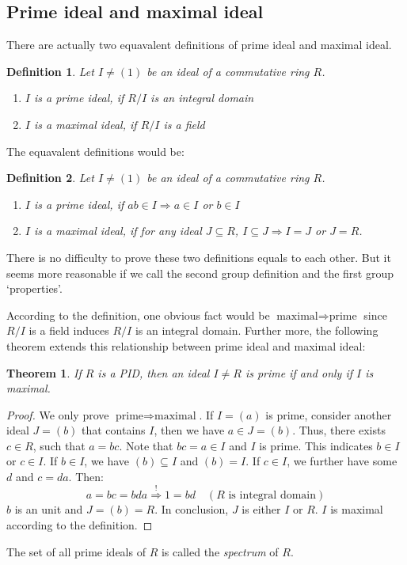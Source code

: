 \documentclass[a4paper, pdf, 11.5pt]{article}
\newtheorem{definition}{Definition}
\newtheorem{theorem}{Theorem}
\begin{document}
\subsection{Prime ideal and maximal ideal}
There are actually two equavalent definitions of prime ideal and maximal ideal. 
\begin{definition}
  Let $I\neq (1)$ be an ideal of a commutative ring $R$.
  \begin{enumerate}
    \item $I$ is a prime ideal, if $R/I$ is an integral domain
    \item $I$ is a maximal ideal, if $R/I$ is a field
  \end{enumerate}
\end{definition}
\noindent
The equavalent definitions would be:
\begin{definition}
  Let $I\neq (1)$ be an ideal of a commutative ring $R$.
  \begin{enumerate}
    \item $I$ is a prime ideal, if $ab\in I\Rightarrow a\in I$ or $b\in I$
    \item $I$ is a maximal ideal, if for any ideal $J\subseteq R$, $I\subseteq J\Rightarrow I=J$ or $J=R$.
  \end{enumerate}
\end{definition}
\noindent
There is no difficulty to prove these two definitions equals to each other. But it seems more reasonable if we call the
second group definition and the first group `properties'.

According to the definition, one obvious fact would be $\mbox{maximal}\Rightarrow \mbox{prime}$ since $R/I$ is a field 
induces $R/I$ is an integral domain. Further more, the following theorem extends this relationship between 
prime ideal and maximal ideal:
\begin{theorem}
  If $R$ is a PID, then an ideal $I\neq R$ is prime if and only if $I$ is maximal.
\end{theorem}
\begin{proof}
  We only prove $\mbox{prime}\Rightarrow \mbox{maximal}$. If $I=(a)$ is prime, consider another ideal $J=(b)$ 
  that contains $I$, then we have $a\in J=(b)$. Thus, there exists $c\in R$, such that $a=bc$. Note that $bc=a\in I$ and 
  $I$ is prime. This indicates $b\in I$ or $c\in I$. If $b\in I$, we have $(b)\subseteq I$ and $(b)=I$. If $c\in I$, we further
  have some $d$ and $c = da$. Then:
  $$ a = bc = bda \stackrel{!}{\Longrightarrow} 1 = bd\quad(\mbox{$R$ is integral domain})
  $$
  $b$ is an unit and $J=(b)=R$. In conclusion, $J$ is either $I$ or $R$. 
  $I$ is maximal according to the definition.
\end{proof}
The set of all prime ideals of $R$ is called the \textit{spectrum} of $R$.
\end{document}
